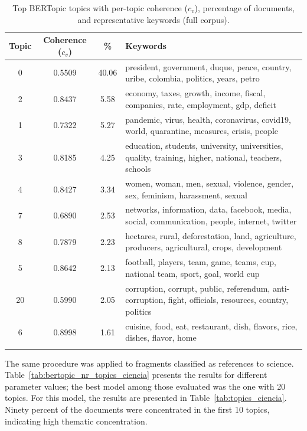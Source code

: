 \documentclass[pdflatex,sn-mathphys-num,iicol]{sn-jnl}
\begin{document}
	\begin{table}[h!]
		\centering
		\small
		\caption{Top BERTopic topics with per-topic coherence ($c_v$), percentage of documents, and representative keywords (full corpus).}
		\label{tab:bertopic_coherence_top}
		\begin{tabularx}{\textwidth}{@{}cccX@{}}
			\toprule
			\textbf{Topic} & \textbf{Coherence ($c_v$)} & \textbf{\%} & \textbf{Keywords} \\
			\midrule
			0  & 0.5509 & 40.06 & president, government, duque, peace, country, uribe, colombia, politics, years, petro \\
			2  & 0.8437 & 5.58  & economy, taxes, growth, income, fiscal, companies, rate, employment, gdp, deficit \\
			1  & 0.7322 & 5.27  & pandemic, virus, health, coronavirus, covid19, world, quarantine, measures, crisis, people \\
			3  & 0.8185 & 4.25  & education, students, university, universities, quality, training, higher, national, teachers, schools \\
			4  & 0.8427 & 3.34  & women, woman, men, sexual, violence, gender, sex, feminism, harassment, sexual \\
			7  & 0.6890 & 2.53  & networks, information, data, facebook, media, social, communication, people, internet, twitter \\
			8  & 0.7879 & 2.23  & hectares, rural, deforestation, land, agriculture, producers, agricultural, crops, development \\
			5  & 0.8642 & 2.13  & football, players, team, game, teams, cup, national team, sport, goal, world cup \\
			20 & 0.5990 & 2.05  & corruption, corrupt, public, referendum, anti-corruption, fight, officials, resources, country, politics \\
			6  & 0.8998 & 1.61  & cuisine, food, eat, restaurant, dish, flavors, rice, dishes, flavor, home \\
			\botrule
		\end{tabularx}
	\end{table}
	
	The same procedure was applied to fragments classified as references to science. 
	Table~\ref{tab:bertopic_nr_topics_ciencia} presents the results for different parameter values; the best model among those evaluated was the one with 20 topics. For this model, the results are presented in Table~\ref{tab:topics_ciencia}. Ninety percent of the documents were concentrated in the first 10 topics, indicating high thematic concentration.
	
\end{document}
